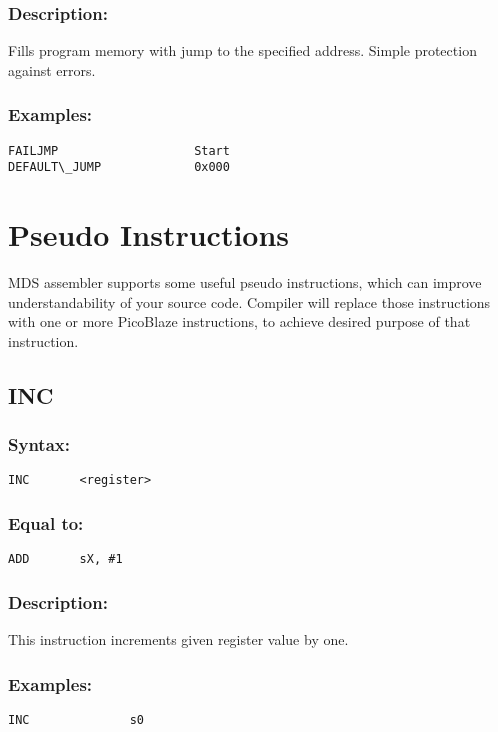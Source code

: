        \subsubsection{Description:}
            Fills program memory with jump to the specified address. Simple protection against errors.

        \subsubsection{Examples:}
            {
                \usecodefont
                \verb'FAILJMP                   Start'\\
                \verb'DEFAULT\_JUMP             0x000'\\
            }


\section{Pseudo Instructions}
    MDS assembler supports some useful pseudo instructions, which can improve understandability of your source code. Compiler will replace those instructions with one or more PicoBlaze instructions, to achieve desired purpose of that instruction.

    \subsection{INC}
        \subsubsection{Syntax:}
        {
            \usecodefont
            \verb'INC       <register>'
        }

        \subsubsection{Equal to:}
        {
            \usecodefont
            \verb'ADD       sX, #1'
        }

        \subsubsection{Description:}
            This instruction increments given register value by one.

        \subsubsection{Examples:}
        {
            \usecodefont
            \verb'INC              s0'\\
        }

